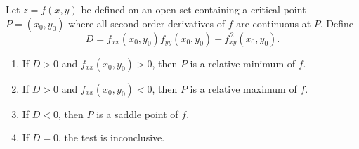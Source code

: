 \begin{theorem}\label{thm:multi_second_test}%
Let $z=f(x,y)$ be defined on an open set containing a critical point $P=(x_0,y_0)$ where all second order derivatives of $f$ are continuous at $P$. Define
\[D = f_{xx}(x_0,y_0)f_{yy}(x_0,y_0)-f_{xy}^{\,2}(x_0,y_0).\]
\begin{enumerate}
	\item If $D>0$ and $f_{xx}(x_0,y_0)>0$, then $P$ is a relative minimum of $f$.
	\item If $D>0$ and $f_{xx}(x_0,y_0)<0$, then $P$ is a relative maximum of $f$.
	\item If $D<0$, then $P$ is a saddle point of $f$.
	\item If $D=0$, the test is inconclusive.
\end{enumerate}
\end{theorem}

